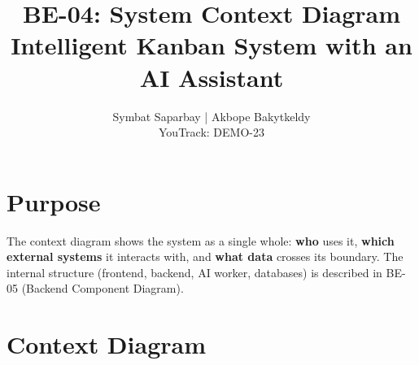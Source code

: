 \documentclass[11pt,a4paper]{article}
\title{\textbf{BE-04: System Context Diagram}\\[4pt]
\large Intelligent Kanban System with an AI Assistant}
\author{Symbat Saparbay | Akbope Bakytkeldy\\ \small YouTrack: DEMO-23}
\date{}
\begin{document}
\maketitle
\section{Purpose}

The context diagram shows the system as a single whole: \textbf{who} uses it, \textbf{which external systems} it interacts with, and \textbf{what data} crosses its boundary. The internal structure (frontend, backend, AI worker, databases) is described in BE-05 (Backend Component Diagram).


\section{Context Diagram}
\end{document}
